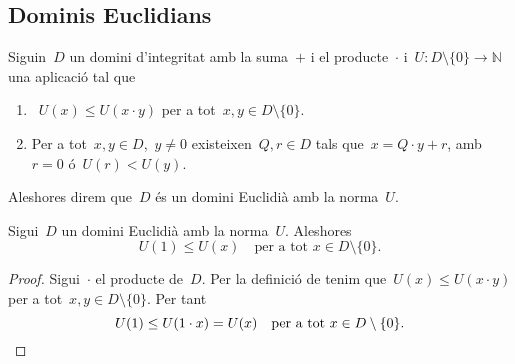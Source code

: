 \documentclass[../../main.tex]{subfiles}
\begin{document}
    \subsection{Dominis Euclidians}
    \begin{definition}
        \label{def:domini Euclidià}
        \label{def:DE}
        Siguin~\(D\) un domini d'integritat amb la suma~\(+\) i el producte~\(\cdot\) i~\(U\colon D\setminus\{0\}\longrightarrow\mathbb{N}\) una aplicació tal que
        \begin{enumerate}
            \item~\(U(x)\leq U(x\cdot y)\) per a tot~\(x,y\in D\setminus\{0\}\).
            \item Per a tot~\(x,y\in D\),~\(y\neq0\) existeixen~\(Q,r\in D\) tals que~\(x=Q\cdot y+r\), amb~\(r=0\) ó~\(U(r)<U(y)\).
        \end{enumerate}
        Aleshores direm que~\(D\) és un domini Euclidià amb la norma~\(U\).
    \end{definition}
    \begin{proposition}
        \label{prop:norma de 1 és la més petita en DE}
        Sigui~\(D\) un domini Euclidià amb la norma~\(U\).
        Aleshores
        \[
            U(1)\leq U(x)\quad\text{per a tot }x\in D\setminus\{0\}.
        \]
        \begin{proof}
            Sigui~\(\cdot\) el producte de~\(D\).
            Per la definició de  tenim que~\(U(x)\leq U(x\cdot y)\) per a tot~\(x,y\in D\setminus\{0\}\).
            Per tant
            \[
                U(1)\leq U(1\cdot x)=U(x)\quad\text{per a tot }x\in D\setminus\{0\}.\qedhere
            \]
        \end{proof}
    \end{proposition}
\end{document}
